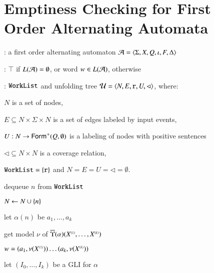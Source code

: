 \section{Emptiness Checking for First Order Alternating Automata}
\label{app:algorithm}

\begin{algorithm}[t!]
\begin{algorithmic}[0] : a first order
  alternating automaton $\mathcal{A} = \langle \Sigma,X,Q,\iota,F,\Delta \rangle$
  
  : $\top$ if $L(\mathcal{A})=\emptyset$, or word $w \in
  L(\mathcal{A})$, otherwise

  : $\mathtt{WorkList}$ and unfolding tree
  $\mathcal{U} = \langle N,E,\mathtt{r},U,\lhd \rangle$,
  where: \begin{compactitem}
  \item $N$ is a set of nodes,
  \item $E \subseteq N \times \Sigma \times N$ is a set of edges labeled by input events,
  \item $U : N \rightarrow \mathsf{Form}^+(Q,\emptyset)$ is a labeling of
    nodes with positive sentences
  \item $\lhd \subseteq N \times N$ is a coverage relation,
  \end{compactitem}  

   $\mathtt{WorkList} = \{ \mathtt{r} \}$ and
  $N=E=U=\lhd=\emptyset$.
\end{algorithmic}
\begin{algorithmic}[1]   
  \While{$\worklist \neq \emptyset$}
  \label{ln:impact-while}

  \State dequeue $n$ from $\mathtt{WorkList}$ 
  \label{ln:impact-dequeue}

  \State $N \leftarrow N \cup \{ n \}$

  \State let $\alpha(n)$ be $a_1, \ldots, a_k$


  \State get model $\nu$ of $\overline{\Upsilon}({\alpha})({X}^{\scriptscriptstyle{({1})}}, \ldots, {X}^{\scriptscriptstyle{({k})}})$

   $w = (a_1,\nu({X}^{\scriptscriptstyle{({1})}})) \ldots (a_k,\nu({X}^{\scriptscriptstyle{({k})}}))$
  \label{ln:impact-nonempty}

  \Else {}

  \State let $(I_0,\ldots,I_k)$ be a GLI for $\alpha$
  \label{ln:refine-begin}


\end{algorithmic}
\end{algorithm}

